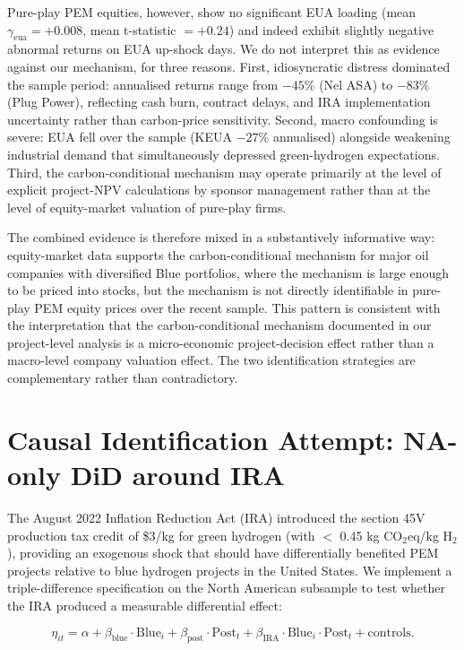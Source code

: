 \documentclass[11pt,a4paper]{article}
\newcommand{\bblue}{\beta_{\mathrm{blue}}}
\begin{document}
Pure-play PEM equities, however, show no significant EUA loading (mean $\gamma_{\mathrm{eua}} = +0.008$, mean t-statistic $= +0.24$) and indeed exhibit slightly negative abnormal returns on EUA up-shock days. We do not interpret this as evidence against our mechanism, for three reasons. First, idiosyncratic distress dominated the sample period: annualised returns range from $-45\%$ (Nel ASA) to $-83\%$ (Plug Power), reflecting cash burn, contract delays, and IRA implementation uncertainty rather than carbon-price sensitivity. Second, macro confounding is severe: EUA fell over the sample (KEUA $-27\%$ annualised) alongside weakening industrial demand that simultaneously depressed green-hydrogen expectations. Third, the carbon-conditional mechanism may operate primarily at the level of explicit project-NPV calculations by sponsor management rather than at the level of equity-market valuation of pure-play firms.

The combined evidence is therefore mixed in a substantively informative way: equity-market data supports the carbon-conditional mechanism for major oil companies with diversified Blue portfolios, where the mechanism is large enough to be priced into stocks, but the mechanism is not directly identifiable in pure-play PEM equity prices over the recent sample. This pattern is consistent with the interpretation that the carbon-conditional mechanism documented in our project-level analysis is a micro-economic project-decision effect rather than a macro-level company valuation effect. The two identification strategies are complementary rather than contradictory.

\section{Causal Identification Attempt: NA-only DiD around IRA}
\label{sec:ch7-did}

The August 2022 Inflation Reduction Act (IRA) introduced the section 45V production tax credit of \$3/kg for green hydrogen (with $<$ 0.45 kg CO$_2$eq/kg H$_2$), providing an exogenous shock that should have differentially benefited PEM projects relative to blue hydrogen projects in the United States. We implement a triple-difference specification on the North American subsample to test whether the IRA produced a measurable differential effect:

\begin{equation}
\eta_{it} = \alpha + \bblue \cdot \mathrm{Blue}_i + \beta_{\mathrm{post}} \cdot \mathrm{Post}_t + \beta_{\mathrm{IRA}} \cdot \mathrm{Blue}_i \cdot \mathrm{Post}_t + \text{controls}.
\end{equation}
\end{document}
